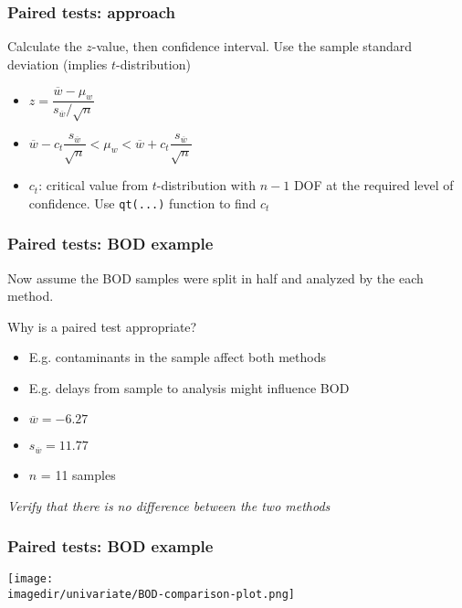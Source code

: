 \begin{frame}\frametitle{Paired tests: approach}

	Calculate the $z$-value, then confidence interval. Use the sample standard deviation (implies $t$-distribution)
	\begin{itemize}
		\item	$z = \dfrac{\overline{w} - \mu_w}{s_{\overline{w}} / \sqrt{n}}$
	\end{itemize}
	\begin{itemize}
		\item	$\overline{w} - c_t \dfrac{s_{\overline{w}}}{\sqrt{n}} < \mu_w < \overline{w} + c_t \dfrac{s_{\overline{w}}}{\sqrt{n}}$
	\end{itemize}
	\begin{itemize}
		\item	$c_t$: critical value from $t$-distribution with $n-1$ DOF at the required level of confidence. Use \texttt{qt(...)} function to find $c_t$
	\end{itemize}
\end{frame}

\begin{frame}\frametitle{Paired tests: BOD example}

	Now assume the BOD samples were split in half and analyzed by the each method.

	Why is a paired test appropriate?
	\begin{itemize}
		\item	E.g. contaminants in the sample affect both methods
		\item	E.g. delays from sample to analysis might influence BOD
	\end{itemize}
	\begin{itemize}
		\item	$\overline{w} = -6.27$
		\item	$s_{\overline{w}} = 11.77$
		\item	$n$ = 11 samples
	\end{itemize}

	\emph{Verify that there is no difference between the two methods}
\end{frame}

\begin{frame}\frametitle{Paired tests: BOD example}
	\begin{center}
		\texttt{[image: \\imagedir/univariate/BOD-comparison-plot.png]}
	\end{center}
\end{frame}

